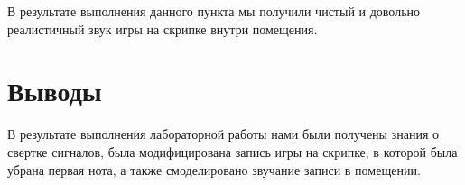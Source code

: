 \documentclass[a4paper]{article}
\begin{document}
            В результате выполнения данного пункта мы получили чистый и довольно реалистичный звук игры на скрипке внутри помещения.
            
    \newpage
        \section{Выводы}
             В результате выполнения лабораторной работы нами были получены знания о свертке сигналов, была модифицирована запись игры на скрипке, в которой была убрана первая нота, а также смоделировано звучание записи в помещении.
            
\end{document}
